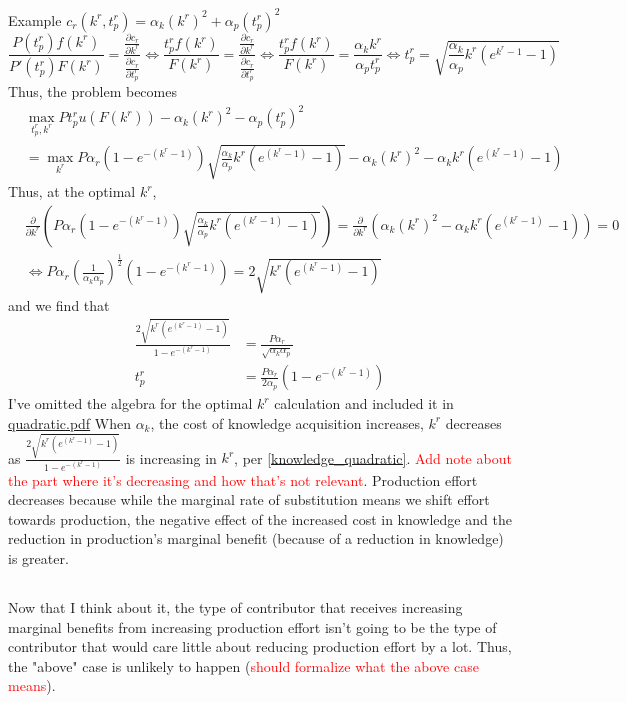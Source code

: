 \documentclass[source/paper/main.tex]{subfiles}
\begin{document}
Example $c_r(k^r, t_p^r) = \alpha_k (k^r)^2 + \alpha_p (t_p^r)^2$\\
$$\frac{P(t_p^r) f(k^r) }{P'(t_p^r) F(k^r)} = \frac{\frac{\partial c_r}{\partial k^r}}{\frac{\partial c_r}{\partial t_p^r}} \iff \frac{t_p^r f(k^r) }{F(k^r)} = \frac{\frac{\partial c_r}{\partial k^r}}{\frac{\partial c_r}{\partial t_p^r}} \iff \frac{t_p^r f(k^r) }{F(k^r)} = \frac{\alpha_k k^r}{\alpha_p t_p^r} \iff t_p^r = \sqrt{\frac{\alpha_k}{\alpha_p} k^r (e^{k^r-1} - 1)} $$
Thus, the problem becomes
\begin{align*}
    &\max_{t_p^r, k^r} P  t_p^r  u(F(k^r)) - \alpha_k (k^r)^2 - \alpha_p (t_p^r)^2 \\
    &= \max_{k^r} P\alpha_r(1-e^{-(k^r-1)}) \sqrt{\frac{\alpha_k}{\alpha_p} k^r (e^{(k^r-1)} - 1)}  -\alpha_k (k^r)^2 - \alpha_k k^r (e^{(k^r-1)} - 1)
\end{align*}
Thus, at the optimal $k^r$, 
\begin{align*}
    &\frac{\partial }{\partial k^r} \left(P\alpha_r(1-e^{-(k^r-1)}) \sqrt{\frac{\alpha_k}{\alpha_p} k^r (e^{(k^r-1)} - 1)}\right) = \frac{\partial }{\partial k^r} \left( \alpha_k (k^r)^2 - \alpha_k k^r (e^{(k^r-1)} - 1) \right) = 0 \\
    &\iff P \alpha_r \left(\frac{1}{\alpha_k \alpha_p}\right)^{\frac12 } (1 - e^{-(k^r-1)}) = 2 \sqrt{k^r (e^{(k^r-1)} - 1)}
\end{align*}
and we find that
\begin{align}
    \frac{2\sqrt{k^r(e^{(k^r-1)} - 1)}}{1-e^{-(k^r-1)}} &= \frac{P\alpha_r}{\sqrt{\alpha_k \alpha_p}} \label{knowledge_quadratic} \\
    t_p^r &= \frac{P\alpha_r}{2\alpha_p} (1-e^{-(k^r-1)}) \label{production_effort_quadratic}
\end{align}
I've omitted the algebra for the optimal $k^r$ calculation and included it in 
\href{run:source/paper/math/quadratic.pdf}{quadratic.pdf}
When $\alpha_k$, the cost of knowledge acquisition increases, $k^r$ decreases as $\frac{2\sqrt{k^r(e^{(k^r-1)} - 1)}}{1-e^{-(k^r-1)}} $ is increasing in $k^r$, per \ref{knowledge_quadratic}. \textcolor{red}{Add note about the part where it's decreasing and how that's not relevant}. Production effort decreases because while the marginal rate of substitution means we shift effort towards production, the negative effect of the increased cost in knowledge and the reduction in production's marginal benefit (because of a reduction in knowledge) is greater.  

\subsection{}
Now that I think about it, the type of contributor that receives increasing marginal benefits from increasing production effort isn't going to be the type of contributor that would care little about reducing production effort by a lot. Thus, the "above" case is unlikely to happen (\textcolor{red}{should formalize what the above case means}). 
\end{document}
